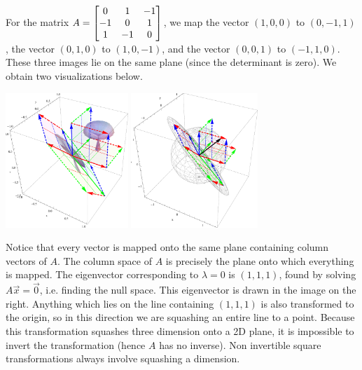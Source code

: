 \begin{example}
For the matrix 
$A=\begin{bmatrix}  0 & 1 & -1 \\ -1 & 0 & 1 \\ 1 & -1 & 0 \end{bmatrix}$, we map 
the vector $(1,0,0)$ to $(0,-1,1)$, 
the vector $(0,1,0)$ to $(1,0,-1)$, and 
the vector $(0,0,1)$ to $(-1,1,0)$. These three images lie on the same plane (since the determinant is zero).  We obtain two visualizations below. 
\begin{center}
\includegraphics[height=2in]{04-Linear-Transformations/support/LTsingular3da}
\includegraphics[height=2in]{04-Linear-Transformations/support/LTsingular3db}
\end{center}
Notice that every vector  is mapped onto the same plane containing column vectors of $A$. 
The column space of $A$ is precisely the plane onto which everything is mapped. 
The eigenvector corresponding to $\lambda =0$ is $(1,1,1)$, found by solving $A\vec x=\vec 0$, i.e. finding the null space.
This eigenvector is drawn in the image on the right.  
Anything which lies on the line containing $(1,1,1)$ is also transformed to the origin, so in this direction we are squashing an entire line to a point. 
Because this transformation squashes three dimension onto a 2D plane, it is impossible to invert the transformation (hence $A$ has no inverse). 
Non invertible square transformations always involve squashing a dimension.

  
\end{example}

